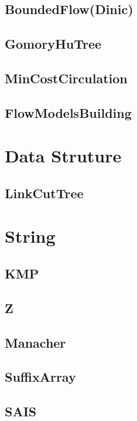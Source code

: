 	\subsection{BoundedFlow(Dinic)}
	
	\subsection{GomoryHuTree}
	
	\subsection{MinCostCirculation}
	
	\subsection{FlowModelsBuilding}
	
\section{Data Struture}
	\subsection{LinkCutTree}
	
\section{String}
	\subsection{KMP}
	
	\subsection{Z}
	
	\subsection{Manacher}
	
	\subsection{SuffixArray}
	
	\subsection{SAIS}
	
